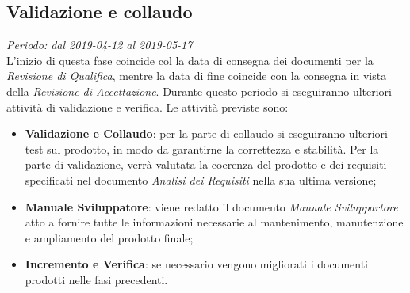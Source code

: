 \subsection{Validazione e collaudo}
\textit{Periodo: dal 2019-04-12 al 2019-05-17 } \\
L'inizio di questa fase coincide col la data di consegna dei documenti per la 
\textit{Revisione di Qualifica}, mentre la data di fine coincide con la 
consegna in vista della \textit{Revisione di Accettazione}. Durante questo periodo 
si eseguiranno ulteriori attività di validazione e verifica. Le attività 
previste sono: 
\begin{itemize}
	\item \textbf{Validazione e Collaudo}: per la parte di collaudo si 
	eseguiranno ulteriori test sul prodotto, in modo da garantirne la 
	correttezza e stabilità. Per la parte di validazione, verrà 
	valutata la coerenza del prodotto e dei requisiti specificati nel documento 
	\textit{Analisi dei Requisiti} nella sua ultima versione;
	\item \textbf{Manuale Sviluppatore}: viene redatto il documento \textit{Manuale Sviluppartore} atto a fornire tutte le informazioni necessarie al mantenimento, manutenzione e ampliamento del prodotto finale;
	\item \textbf{Incremento e Verifica}: se necessario vengono migliorati i 
	documenti prodotti nelle fasi precedenti.
\end{itemize}